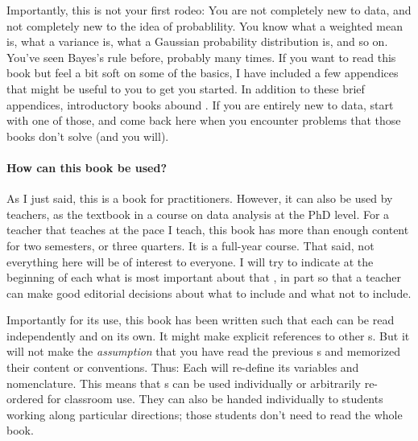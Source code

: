 Importantly, this is not your first rodeo:
You are not completely new to data, and not completely new to the idea of probablility.
You know what a weighted mean is, what a variance is, what a Gaussian probability distribution is, and so on.
You've seen Bayes's rule before, probably many times.
If you want to read this book but feel a bit soft on some of the basics, I have included a few appendices that might be useful to you to get you started.
In addition to these brief appendices, introductory books abound \cite{stuff}.
If you are entirely new to data, start with one of those, and come back here when you encounter problems that those books don't solve (and you will).

\paragraph{How can this book be used?}
As I just said, this is a book for practitioners.
However, it can also be used by teachers, as the textbook in a course on data analysis at the PhD level.
For a teacher that teaches at the pace I teach, this book has more than enough content for two semesters, or three quarters.
It is a full-year course.
That said, not everything here will be of interest to everyone.
I will try to indicate at the beginning of each \chaptername{} what is most important about that \chaptername, in part so that a teacher can make good editorial decisions about what to include and what not to include.

Importantly for its use, this book has been written such that each \chaptername{} can be read independently and on its own.
It might make explicit references to other \chaptername s.
But it will not make the \emph{assumption} that you have read the previous \chaptername s and memorized their content or conventions.
Thus: Each \chaptername{} will re-define its variables and nomenclature.
This means that \chaptername s can be used individually or arbitrarily re-ordered for classroom use.
They can also be handed individually to students working along particular directions; those students don't need to read the whole book.

